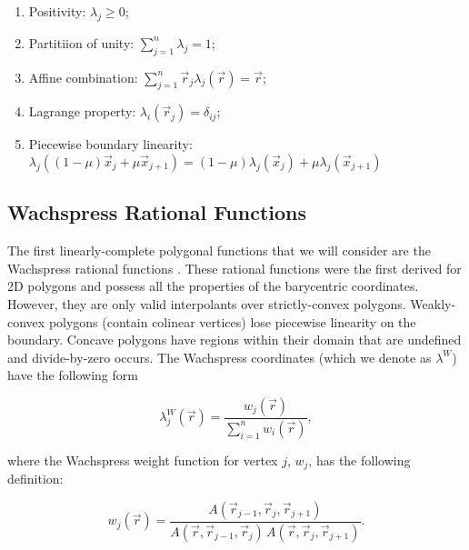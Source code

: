 \documentclass[preprint,10pt]{elsarticle}
\begin{document}
\begin{enumerate}
\item Positivity: $\lambda_j \geq 0$;
\item Partitiion of unity: $\sum\limits_{j=1}^n \lambda_j = 1$;
\item Affine combination: $\sum\limits_{j=1}^n \vec{r}_j \lambda_j (\vec{r}) = \vec{r}$;
\item Lagrange property: $\lambda_i (\vec{r}_j) = \delta_{ij}$;
\item Piecewise boundary linearity: $\lambda_j ((1-\mu ) \vec{x}_j  + \mu \vec{x}_{j+1})  = (1-\mu ) \lambda_j (\vec{x}_j ) + \mu \lambda_j (\vec{x}_{j+1} )$
\end{enumerate}

\subsection{Wachspress Rational Functions}

The first linearly-complete polygonal functions that we will consider are the Wachspress rational functions \cite{wachspress1975rational}. These rational functions were the first derived for 2D polygons and possess all the properties of the barycentric coordinates. However, they are only valid interpolants over strictly-convex polygons. Weakly-convex polygons (contain colinear vertices) lose piecewise linearity on the boundary. Concave polygons have regions within their domain that are undefined and divide-by-zero occurs. The Wachspress coordinates (which we denote as $\lambda^W$) have the following form

\begin{equation}
\label{eq::wach_BF}
\lambda_{j}^{W} (\vec{r}) = \frac{w_j (\vec{r}) }{\sum\limits_{i=1}^{n} w_i (\vec{r})},
\end{equation}

\noindent where the Wachspress weight function for vertex $j$, $w_j$, has the following definition:

\begin{equation}
\label{eq::wach_weights}
w_j (\vec{r})  = \frac{A(\vec{r}_{j-1}, \vec{r}_{j}, \vec{r}_{j+1})}{A(\vec{r}, \vec{r}_{j-1}, \vec{r}_{j}) \, A(\vec{r}, \vec{r}_{j}, \vec{r}_{j+1})} .
\end{equation}
\end{document}
